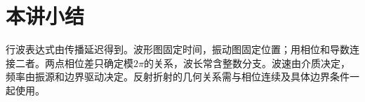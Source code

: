 \section{本讲小结}
行波表达式由传播延迟得到。波形图固定时间，振动图固定位置；用相位和导数连接二者。两点相位差只确定模$2\pi$的关系，波长常含整数分支。波速由介质决定，频率由振源和边界驱动决定。反射折射的几何关系需与相位连续及具体边界条件一起使用。
